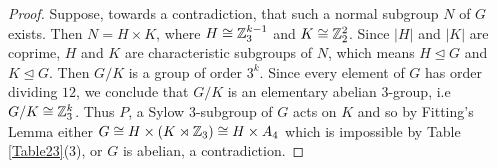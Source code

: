 \documentclass{amsart}
\def \leq {\leqslant}
\def\Aut{{\sf Aut}} \def\Inn{{\sf Inn}}\def\Core{{\sf Core}}
\begin{document}
\begin{proof}
Suppose, towards a contradiction, that such a normal subgroup $N$ of $G$ exists. Then $N=H\times K$, where $H\cong\Bbb Z_3^{k-1}$ and $K\cong\Bbb Z_2^2$. Since $|H|$ and $|K|$ are coprime, $H$ and $K$ are characteristic subgroups of $N$, which means $H\unlhd G$ and $K\unlhd G$. Then $G/K$ is a group of order $3^k$. Since every element of $G$ has order dividing $12$, we conclude that $G/K$ is an elementary abelian $3$-group, i.e $G/K\cong\Bbb Z_3^k$. Thus  $P$, a Sylow $3$-subgroup of $G$ acts on $K$ and so by Fitting's Lemma  either $G\cong H\times (K\rtimes \Bbb Z_3)\cong H\times A_4$ which is impossible by Table \ref{Table23}(3), or $G$ is abelian, a contradiction.  
\end{proof}

\end{document}

